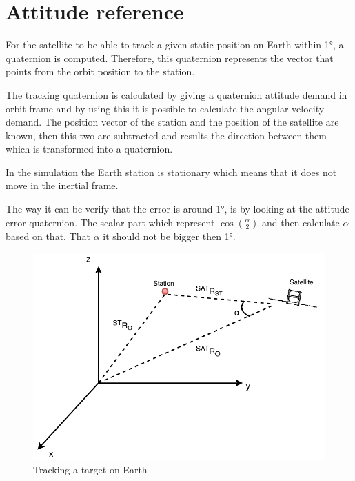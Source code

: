 \section{Attitude reference}
For the satellite to be able to track a given static position on Earth within 1°, a quaternion is computed. Therefore, this quaternion represents the vector that points from the orbit position to the station.

The tracking quaternion is calculated by giving a quaternion attitude demand in orbit frame and by using this it is possible to calculate the angular velocity demand. The position vector of the station and the position of the satellite are known, then this two are subtracted and results the direction between them which is transformed into a quaternion.

In the simulation the Earth station is stationary which means that it does not move in the inertial frame.

The way it can be verify that the error is around 1°, is by looking at the attitude error quaternion.  The scalar part which represent $\cos (\frac{\alpha}{2}) $ and then calculate $\alpha$ based on that.  That $\alpha$ it should not be bigger then 1°.

\begin{figure}[H]
	\centering
	\includegraphics[width=0.7\linewidth]{figures/ST}
	\caption{Tracking a target on Earth }
	\label{fig:TS}
\end{figure}

 